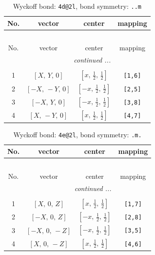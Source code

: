 \documentclass[fleqn,8pt]{jsarticle}
\begin{document}
\begin{longtable}{cccc}
\caption{Wyckoff bond: {\tt 4d@2l}, bond symmetry: {\tt ..m}}
 \\
 \hline \hline
No. & vector & center & mapping \\ \hline \endfirsthead

\multicolumn{3}{l}{\tablename\ \thetable{}} \\
 \hline \hline
No. & vector & center & mapping \\ \hline \endhead

 \hline \hline
\multicolumn{3}{r}{\footnotesize\it continued ...} \\ \endfoot

 \hline \hline
\multicolumn{3}{r}{} \\ \endlastfoot

1 & $\left[ X,\, Y,\, 0 \right]$ & $\left[ x,\, \frac{1}{2},\, \frac{1}{2} \right]$ & {\tt [1,6]} \\ \hline
2 & $\left[ - X,\, - Y,\, 0 \right]$ & $\left[ - x,\, \frac{1}{2},\, \frac{1}{2} \right]$ & {\tt [2,5]} \\ \hline
3 & $\left[ - X,\, Y,\, 0 \right]$ & $\left[ - x,\, \frac{1}{2},\, \frac{1}{2} \right]$ & {\tt [3,8]} \\ \hline
4 & $\left[ X,\, - Y,\, 0 \right]$ & $\left[ x,\, \frac{1}{2},\, \frac{1}{2} \right]$ & {\tt [4,7]} \\
\end{longtable}
\renewcommand{\arraystretch}{1.2}
\begin{longtable}{cccc}
\caption{Wyckoff bond: {\tt 4e@2l}, bond symmetry: {\tt .m.}}
 \\
 \hline \hline
No. & vector & center & mapping \\ \hline \endfirsthead

\multicolumn{3}{l}{\tablename\ \thetable{}} \\
 \hline \hline
No. & vector & center & mapping \\ \hline \endhead

 \hline \hline
\multicolumn{3}{r}{\footnotesize\it continued ...} \\ \endfoot

 \hline \hline
\multicolumn{3}{r}{} \\ \endlastfoot

1 & $\left[ X,\, 0,\, Z \right]$ & $\left[ x,\, \frac{1}{2},\, \frac{1}{2} \right]$ & {\tt [1,7]} \\ \hline
2 & $\left[ - X,\, 0,\, Z \right]$ & $\left[ - x,\, \frac{1}{2},\, \frac{1}{2} \right]$ & {\tt [2,8]} \\ \hline
3 & $\left[ - X,\, 0,\, - Z \right]$ & $\left[ - x,\, \frac{1}{2},\, \frac{1}{2} \right]$ & {\tt [3,5]} \\ \hline
4 & $\left[ X,\, 0,\, - Z \right]$ & $\left[ x,\, \frac{1}{2},\, \frac{1}{2} \right]$ & {\tt [4,6]} \\
\end{longtable}
\end{document}
